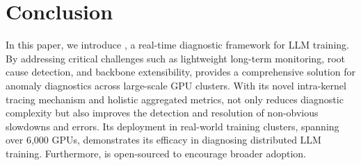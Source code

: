 \section{Conclusion}

In this paper, we introduce \sysname{}, a real-time diagnostic framework for LLM training. By addressing critical challenges such as lightweight long-term monitoring, root cause detection, and backbone extensibility, \sysname{} provides a comprehensive solution for anomaly diagnostics across large-scale GPU clusters. With its novel intra-kernel tracing mechanism and holistic aggregated metrics, \sysname{} not only reduces diagnostic complexity but also improves the detection and resolution of non-obvious slowdowns and errors. Its deployment in real-world training clusters, spanning over 6,000 GPUs, demonstrates its efficacy in diagnosing distributed LLM training. Furthermore, \sysname{} is open-sourced to encourage broader adoption.